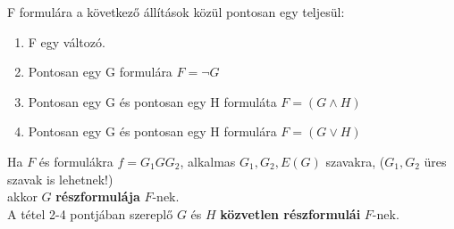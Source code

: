 \documentclass{beamer}
\newcommand{\mbigskip}{\vspace{1em}}
\begin{document}
\begin{frame}
\begin{tcolorbox}[title={Tétel: Minden formula egyértelműen olvasható}]
F formulára a következő állítások közül pontosan egy teljesül:
\begin{enumerate}
\item F egy változó.
\item Pontosan egy G formulára $F = \neg G$
\item Pontosan egy G és pontosan egy H formuláta $F = (G \land H)$
\item Pontosan egy G és pontosan egy H formulára $F = (G \lor H)$
\end{enumerate}
\end{tcolorbox}
\end{frame}

\begin{frame}
\begin{tcolorbox}[title={Részformula, Közvetlen részformula}]
Ha $F$ és formulákra  $f = G_1GG_2$, alkalmas $G_1, G_2, E(G)$ szavakra, ($G_1, G_2$ üres szavak is lehetnek!)\\
akkor $G$ \textbf{részformulája} $F$-nek.\\
\mbigskip
A tétel 2-4 pontjában szereplő $G$ és $H$ \textbf{közvetlen részformulái} $F$-nek.
\end{tcolorbox}
\end{frame}
\end{document}
